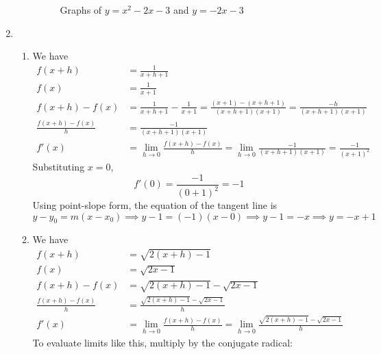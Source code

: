 \documentclass{article}
\begin{document}
\begin{enumerate}
\begin{enumerate}
\begin{figure}[htbp]
      \caption{Graphs of $y=x^2-2x-3$ and $y=-2x-3$}
      \label{fig:graphParabola}
    \end{figure}
  \end{enumerate}
\item %
  \begin{enumerate}
  \item %
    We have
    \begin{align*}
      f(x+h) &= \frac{1}{x+h+1} \\
      f(x) &= \frac{1}{x+1} \\
      f(x+h)-f(x) &= \frac{1}{x+h+1} - \frac{1}{x+1} = \frac{(x+1) -
        (x+h+1)}{(x+h+1)(x+1)}
      = \frac{-h}{(x+h+1)(x+1)} \\
      \frac{f(x+h) - f(x)}{h} &= \frac{-1}{(x+h+1)(x+1)} \\
      f'(x) &= \lim_{h\to 0} \frac{f(x+h)-f(x)}{h} = \lim_{h\to 0}
      \frac{-1}{(x+h+1)(x+1)} = \frac{-1}{(x+1)^2}
    \end{align*}
    Substituting $x=0$,
    \begin{equation*}
      f'(0) = \frac{-1}{(0+1)^2} = -1
    \end{equation*}
    Using point-slope form, the equation of the tangent line is
    \begin{equation*}
      y - y_0 = m(x-x_0) \implies y - 1 = (-1) (x-0) \implies y - 1 =
      -x \implies y = -x + 1
    \end{equation*}
  \item %
    We have
    \begin{align*}
      f(x+h) &= \sqrt{2(x+h)-1} \\
      f(x) &= \sqrt{2x-1} \\
      f(x+h) - f(x) &= \sqrt{2(x+h)-1} - \sqrt{2x-1} \\
      \frac{f(x+h) - f(x)}{h} &= \frac{\sqrt{2(x+h)-1} -
        \sqrt{2x-1}}{h} \\
      f'(x) &= \lim_{h\to 0} \frac{f(x+h) - f(x)}{h} = \lim_{h\to 0}
      \frac{\sqrt{2(x+h)-1} - \sqrt{2x-1}}{h}
    \end{align*}
    To evaluate limits like this, multiply by the conjugate radical:
    \begin{align*}

\end{align*}
\end{enumerate}
\end{enumerate}
\end{document}
